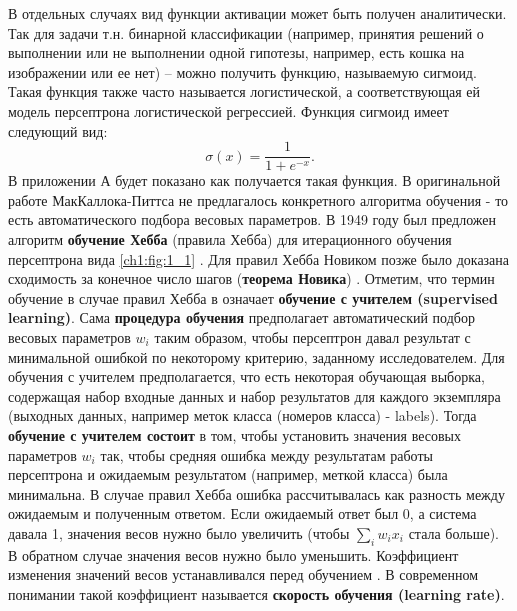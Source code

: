 \documentclass[12pt]{article}
\begin{document}
\begin{sloppypar}
В отдельных случаях вид функции активации может быть получен аналитически. Так для задачи т.н. бинарной классификации (например, принятия решений о выполнении или не выполнении одной гипотезы, например, есть кошка на изображении или ее нет) – можно получить функцию, называемую сигмоид. Такая функция также часто называется логистической, а соответствующая ей модель персептрона логистической регрессией. Функция сигмоид имеет следующий вид:
    \begin{equation}
    	\sigma(x)= \frac{1}{1+e^{-x}}. 
    	\label{ch1:eqn:sigmoid}
    \end{equation}
В приложении А будет показано как получается такая функция. 
В оригинальной работе МакКаллока-Питтса не предлагалось конкретного алгоритма обучения - то есть автоматического  подбора весовых параметров. В 1949 году  был предложен алгоритм \textbf{обучение Хебба}  (правила Хебба) для итерационного обучения персептрона вида \ref{ch1:fig:1_1} \cite{hebb1949organization}. Для правил Хебба Новиком позже было доказана сходимость за конечное число шагов (\textbf{теорема Новика}) \cite{novikoff1963convergence}.
Отметим, что термин обучение в случае правил Хебба в означает \textbf{обучение с учителем (supervised learning)}. Сама \textbf{процедура обучения} предполагает автоматический подбор весовых параметров $w_i$ таким образом, чтобы персептрон давал результат с минимальной ошибкой по некоторому критерию, заданному исследователем. Для обучения с учителем предполагается, что есть некоторая обучающая выборка, содержащая набор входные данных и набор результатов для каждого экземпляра (выходных данных, например меток класса (номеров класса) - labels). Тогда \textbf{обучение с учителем состоит} в том, чтобы установить значения весовых параметров $w_i$ так, чтобы средняя ошибка между результатам работы персептрона и ожидаемым результатом (например, меткой класса) была минимальна. 
В случае правил Хебба ошибка рассчитывалась как разность между ожидаемым и полученным ответом. Если ожидаемый ответ был 0, а система давала 1, значения весов нужно было увеличить (чтобы $\sum_i w_ix_i$ стала больше). В обратном случае значения весов нужно было уменьшить. Коэффициент изменения значений весов устанавливался перед обучением \cite{hebb1949organization}. В современном понимании такой коэффициент называется \textbf{скорость обучения (learning rate)}. 


\end{sloppypar}
\end{document}
